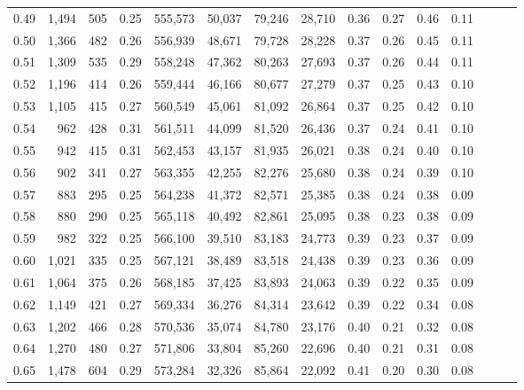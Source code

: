\begin{tabular}{rrrrrrrrrrrrrrr}
0.49 &   1,494 &    505 &  0.25 &  555,573 &   50,037 &   79,246 &   28,710 &  0.36 &  0.27 &  0.46 &      0.11 \\
0.50 &   1,366 &    482 &  0.26 &  556,939 &   48,671 &   79,728 &   28,228 &  0.37 &  0.26 &  0.45 &      0.11 \\
0.51 &   1,309 &    535 &  0.29 &  558,248 &   47,362 &   80,263 &   27,693 &  0.37 &  0.26 &  0.44 &      0.11 \\
0.52 &   1,196 &    414 &  0.26 &  559,444 &   46,166 &   80,677 &   27,279 &  0.37 &  0.25 &  0.43 &      0.10 \\
0.53 &   1,105 &    415 &  0.27 &  560,549 &   45,061 &   81,092 &   26,864 &  0.37 &  0.25 &  0.42 &      0.10 \\
0.54 &     962 &    428 &  0.31 &  561,511 &   44,099 &   81,520 &   26,436 &  0.37 &  0.24 &  0.41 &      0.10 \\
0.55 &     942 &    415 &  0.31 &  562,453 &   43,157 &   81,935 &   26,021 &  0.38 &  0.24 &  0.40 &      0.10 \\
0.56 &     902 &    341 &  0.27 &  563,355 &   42,255 &   82,276 &   25,680 &  0.38 &  0.24 &  0.39 &      0.10 \\
0.57 &     883 &    295 &  0.25 &  564,238 &   41,372 &   82,571 &   25,385 &  0.38 &  0.24 &  0.38 &      0.09 \\
0.58 &     880 &    290 &  0.25 &  565,118 &   40,492 &   82,861 &   25,095 &  0.38 &  0.23 &  0.38 &      0.09 \\
0.59 &     982 &    322 &  0.25 &  566,100 &   39,510 &   83,183 &   24,773 &  0.39 &  0.23 &  0.37 &      0.09 \\
0.60 &   1,021 &    335 &  0.25 &  567,121 &   38,489 &   83,518 &   24,438 &  0.39 &  0.23 &  0.36 &      0.09 \\
0.61 &   1,064 &    375 &  0.26 &  568,185 &   37,425 &   83,893 &   24,063 &  0.39 &  0.22 &  0.35 &      0.09 \\
0.62 &   1,149 &    421 &  0.27 &  569,334 &   36,276 &   84,314 &   23,642 &  0.39 &  0.22 &  0.34 &      0.08 \\
0.63 &   1,202 &    466 &  0.28 &  570,536 &   35,074 &   84,780 &   23,176 &  0.40 &  0.21 &  0.32 &      0.08 \\
0.64 &   1,270 &    480 &  0.27 &  571,806 &   33,804 &   85,260 &   22,696 &  0.40 &  0.21 &  0.31 &      0.08 \\
0.65 &   1,478 &    604 &  0.29 &  573,284 &   32,326 &   85,864 &   22,092 &  0.41 &  0.20 &  0.30 &      0.08 \\

\end{tabular}
